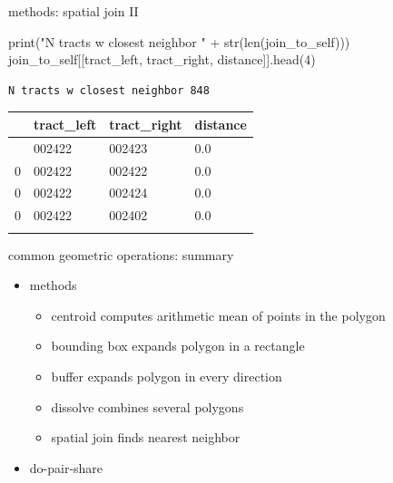 \documentclass[
  ignorenonframetext,
]{beamer}
\newenvironment{Shaded}{\begin{snugshade}}{\end{snugshade}}
\newcommand{\BuiltInTok}[1]{\textcolor[rgb]{0.00,0.23,0.31}{#1}}
\newcommand{\DecValTok}[1]{\textcolor[rgb]{0.68,0.00,0.00}{#1}}
\newcommand{\NormalTok}[1]{\textcolor[rgb]{0.00,0.23,0.31}{#1}}
\newcommand{\OperatorTok}[1]{\textcolor[rgb]{0.37,0.37,0.37}{#1}}
\newcommand{\StringTok}[1]{\textcolor[rgb]{0.13,0.47,0.30}{#1}}
\providecommand{\tightlist}{%
  \setlength{\itemsep}{0pt}\setlength{\parskip}{0pt}}\usepackage{longtable,booktabs,array}
\begin{document}
\begin{frame}[fragile]{methods: spatial join II}
\label{methods-spatial-join-ii}
\begin{Shaded}
\begin{Highlighting}[]
\BuiltInTok{print}\NormalTok{(}\StringTok{"N tracts w closest neighbor "} \OperatorTok{+} 
    \BuiltInTok{str}\NormalTok{(}\BuiltInTok{len}\NormalTok{(join\_to\_self)))}
\NormalTok{join\_to\_self[[}\StringTok{\textquotesingle{}tract\_left\textquotesingle{}}\NormalTok{, }\StringTok{\textquotesingle{}tract\_right\textquotesingle{}}\NormalTok{, }\StringTok{\textquotesingle{}distance\textquotesingle{}}\NormalTok{]].head(}\DecValTok{4}\NormalTok{)}
\end{Highlighting}
\end{Shaded}

\begin{verbatim}
N tracts w closest neighbor 848
\end{verbatim}

\begin{longtable}[]{@{}llll@{}}
\toprule\noalign{}
& tract\_left & tract\_right & distance \\
\midrule\noalign{}
\endhead
0 & 002422 & 002423 & 0.0 \\
0 & 002422 & 002422 & 0.0 \\
0 & 002422 & 002424 & 0.0 \\
0 & 002422 & 002402 & 0.0 \\
\bottomrule\noalign{}
\end{longtable}
\end{frame}

\begin{frame}{common geometric operations: summary}
\label{common-geometric-operations-summary}
\begin{itemize}
\tightlist
\item
  methods

  \begin{itemize}
  \tightlist
  \item
    centroid computes arithmetic mean of points in the polygon
  \item
    bounding box expands polygon in a rectangle
  \item
    buffer expands polygon in every direction
  \item
    dissolve combines several polygons
  \item
    spatial join finds nearest neighbor
  \end{itemize}
\item
  do-pair-share
\end{itemize}
\end{frame}
\end{document}
